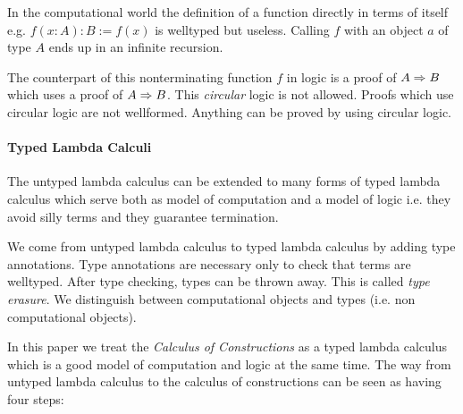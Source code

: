 In the computational world the definition of a function directly in terms of
itself e.g.  $f(x: A): B := f(x)$ is welltyped but useless. Calling $f$ with an
object $a$ of type $A$ ends up in an infinite recursion.

The counterpart of this nonterminating function $f$ in logic is a proof of $A
\Rightarrow B$ which uses a proof of $A \Rightarrow B$. This \emph{circular} logic is not
allowed. Proofs which use circular logic are not wellformed. Anything can be
proved by using circular logic.




\paragraph{Typed Lambda Calculi}
The untyped lambda calculus can be extended to many forms of typed lambda
calculus which serve both as model of computation and a model of logic i.e.
they avoid silly terms and they guarantee termination.

We come from untyped lambda calculus to typed lambda calculus by adding type
annotations. Type annotations are necessary only to check that terms are
welltyped. After type checking, types can be thrown away. This is called
\emph{type erasure}. We distinguish between computational objects and types
(i.e. non computational objects).

In this paper we treat the \emph{Calculus of Constructions} as a typed
lambda calculus which is a good model of computation and logic at the same time.
The way from untyped lambda calculus to the calculus of constructions can be
seen as having four steps:

